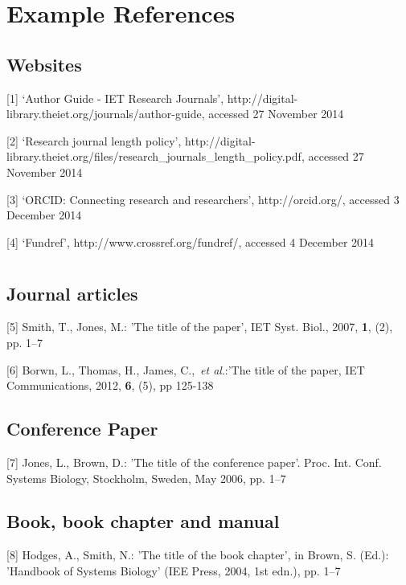 \documentclass{IET}
\begin{document}
{\parindent0pt
\parskip8pt

\section{Example References}

\subsection{Websites}

[1] `Author Guide - IET Research Journals', http://digital-library.theiet.org/journals/author-guide, accessed 27
November 2014

[2] `Research journal length policy', http://digital-library.theiet.org/files/research\_journals\_\break length\_policy.pdf, accessed 27
November 2014

[3] `ORCID: Connecting research and researchers', http://orcid.org/,
accessed 3 December 2014

[4] `Fundref', http://www.crossref.org/fundref/, accessed 4 December 2014

\section{}

\subsection{Journal articles}

[5] Smith, T., Jones, M.: 'The title of the paper', IET Syst. Biol., 2007, \textbf{1}, (2), pp. 1--7

[6] Borwn, L., Thomas, H., James, C.,~\textit{et al}.:'The title of the paper, IET
Communications, 2012, \textbf{6}, (5), pp 125-138

\subsection{Conference Paper}

[7] Jones, L., Brown, D.: 'The title of the conference paper'. Proc. Int.
Conf. Systems Biology, Stockholm, Sweden, May 2006, pp. 1--7

\subsection{Book, book chapter and manual}

[8] Hodges, A., Smith, N.: 'The title of the book chapter', in Brown, S.
(Ed.): 'Handbook of Systems Biology' (IEE Press, 2004, 1st edn.), pp. 1--7

}
\end{document}
